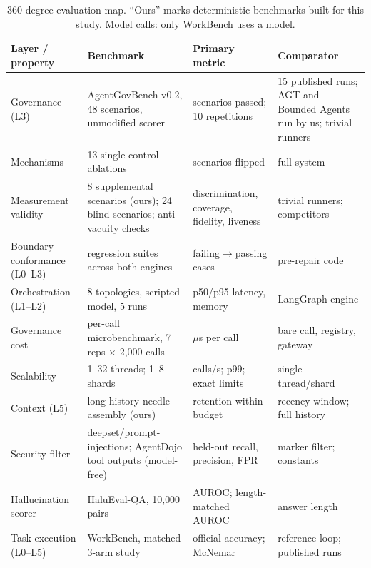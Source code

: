 \begin{table}[t]
\centering\small
\caption{360-degree evaluation map. ``Ours'' marks deterministic benchmarks built for this study. Model calls: only WorkBench uses a model.}
\label{tab:protocol}
\begin{tabularx}{\textwidth}{P{2.1cm}P{3.3cm}YP{2.6cm}}
\toprule
Layer / property & Benchmark & Primary metric & Comparator \\
\midrule
Governance (L3) & AgentGovBench v0.2, 48 scenarios, unmodified scorer & scenarios passed; 10 repetitions & 15 published runs; AGT and Bounded Agents run by us; trivial runners \\
Mechanisms & 13 single-control ablations & scenarios flipped & full system \\
Measurement validity & 8 supplemental scenarios (ours); 24 blind scenarios; anti-vacuity checks & discrimination, coverage, fidelity, liveness & trivial runners; competitors \\
Boundary conformance (L0--L3) & regression suites across both engines & failing$\to$passing cases & pre-repair code \\
Orchestration (L1--L2) & 8 topologies, scripted model, 5 runs & p50/p95 latency, memory & LangGraph engine \\
Governance cost & per-call microbenchmark, 7 reps $\times$ 2{,}000 calls & $\mu$s per call & bare call, registry, gateway \\
Scalability & 1--32 threads; 1--8 shards & calls/s; p99; exact limits & single thread/shard \\
Context (L5) & long-history needle assembly (ours) & retention within budget & recency window; full history \\
Security filter & deepset/prompt-injections; AgentDojo tool outputs (model-free) & held-out recall, precision, FPR & marker filter; constants \\
Hallucination scorer & HaluEval-QA, 10{,}000 pairs & AUROC; length-matched AUROC & answer length \\
Task execution (L0--L5) & WorkBench, matched 3-arm study & official accuracy; McNemar & reference loop; published runs \\
\bottomrule
\end{tabularx}
\end{table}


